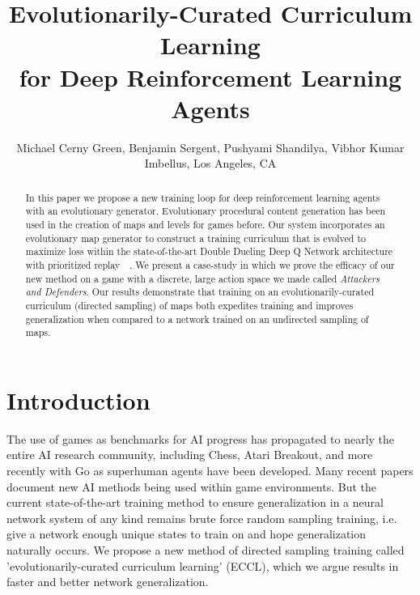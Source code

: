 \documentclass[letterpaper]{article} %
\begin{document}
%
\title{Evolutionarily-Curated Curriculum Learning\\ for Deep Reinforcement Learning Agents
}

\author{Michael Cerny Green, Benjamin Sergent, Pushyami Shandilya, Vibhor Kumar\\Imbellus, Los Angeles, CA}


\maketitle


\begin{abstract}

In this paper we propose a new training loop for deep reinforcement learning agents with an evolutionary generator. Evolutionary procedural content generation has been used in the creation of maps and levels for games before. Our system incorporates an evolutionary map generator to construct a training curriculum that is evolved to maximize loss within the state-of-the-art Double Dueling Deep Q Network architecture with prioritized replay~\cite{wang2016dueling}~\cite{schaul2015prioritized}. We present a case-study in which we prove the efficacy of our new method on a game with a discrete, large action space we made called \emph{Attackers and Defenders}. Our results demonstrate that training on an evolutionarily-curated curriculum (directed sampling) of maps both expedites training and improves generalization when compared to a network trained on an undirected sampling of maps.
\end{abstract}


\section{Introduction}
The use of games as benchmarks for AI progress has propagated to nearly the entire AI research community, including Chess, Atari Breakout, and more recently with Go as superhuman agents have been developed. Many recent papers document new AI methods being used within game environments. But the current state-of-the-art training method to ensure generalization in a neural network system of any kind remains brute force random sampling training, i.e. give a network enough unique states to train on and hope generalization naturally occurs. We propose a new method of directed sampling training called 'evolutionarily-curated curriculum learning' (ECCL), which we argue results in faster and better network generalization.
\end{document}
